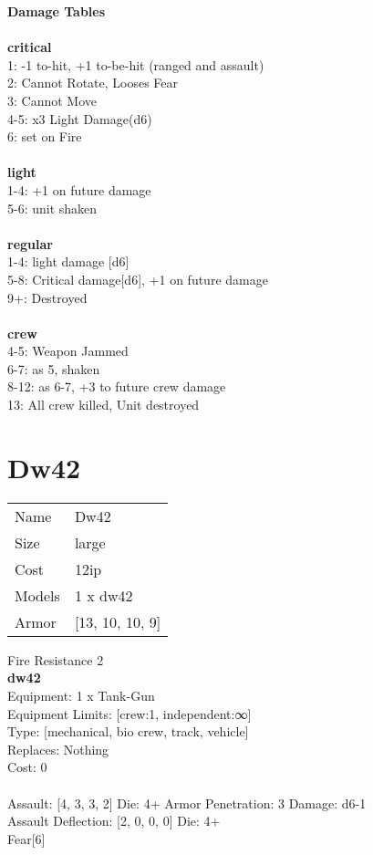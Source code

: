 {\bf Damage Tables} \\
\ \\ {\bf critical } \\
1: -1 to-hit, +1 to-be-hit (ranged and assault) \\
2: Cannot Rotate, Looses Fear \\
3: Cannot Move \\
4-5: x3 Light Damage(d6) \\
6: set on Fire \\
\ \\ {\bf light } \\
1-4: +1 on future damage \\
5-6: unit shaken \\
\ \\ {\bf regular } \\
1-4: light damage [d6] \\
5-8: Critical damage[d6], +1 on future damage \\
9+: Destroyed \\
\ \\ {\bf crew } \\
4-5: Weapon Jammed \\
6-7: as 5, shaken \\
8-12: as 6-7, +3 to future crew damage \\
13: All crew killed, Unit destroyed \\










\pagebreak\pagebreak

\section{ Dw42 }

\begin{tabular}{ll}
  Name & Dw42 \\
  Size & large\\
  Cost & 12ip\\
  Models & 1 x dw42\\
  Armor & [13, 10, 10, 9]\\
\end{tabular}

\noindent Fire Resistance 2\\ 


{\bf dw42 } \\
Equipment: 1 x Tank-Gun \\
Equipment Limits: [crew:1, independent:∞] \\
Type: [mechanical, bio crew, track, vehicle] \\
Replaces: Nothing \\
Cost: 0\\
\ \\
Assault: [4, 3, 3, 2] Die: 4+ Armor Penetration: 3 Damage: d6-1 \\
Assault Deflection: [2, 0, 0, 0] Die: 4+\\
\indent Fear[6]\\ 
 
